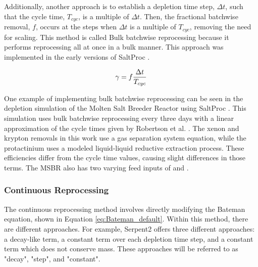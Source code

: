Additionally, another approach is to establish a depletion time step, $\Delta t$, such that the cycle time, $T_{cyc}$, is a multiple of $\Delta t$. Then, the fractional batchwise removal, $f$, occurs at the steps when $\Delta t$ is a multiple of $T_{cyc}$, removing the need for scaling. This method is called Bulk batchwise reprocessing because it performs reprocessing all at once in a bulk manner. This approach was implemented in the early versions of SaltProc \cite{rykhlevskii_modeling_2019}.

\begin{equation} \hfill
\gamma = f \frac{\Delta t}{T_{cyc}}
\hfill\label{eq:batchwise_rem_eff} \end{equation}

One example of implementing bulk batchwise reprocessing can be seen in the depletion simulation of the Molten Salt Breeder Reactor using SaltProc \cite{rykhlevskii_modeling_2019}. This simulation uses bulk batchwise reprocessing every three days with a linear approximation of the cycle times given by Robertson et al. \cite{robertson_conceptual_1971, rykhlevskii_modeling_2019}. The xenon and krypton removals in this work use a gas separation system equation, while the protactinium uses a modeled liquid-liquid reductive extraction process. These efficiencies differ from the cycle time values, causing slight differences in those terms. The MSBR also has two varying feed inputs of  and .



\subsubsection{Continuous Reprocessing}

The continuous reprocessing method involves directly modifying the Bateman equation, shown in Equation \eqref{eq:Bateman_default}. Within this method, there are different approaches. For example, Serpent2 offers three different approaches: a decay-like term, a constant term over each depletion time step, and a constant term which does not conserve mass. These approaches will be referred to as "decay", "step", and "constant".

